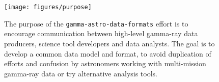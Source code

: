 \begin{figure}[tb]
\centerline{\texttt{[image: figures/purpose]}}
\caption{
The purpose of the \texttt{gamma-astro-data-formats} effort is to encourage communication between high-level gamma-ray data producers, science tool developers and data analysts. The goal is to develop a common data model and format, 
to avoid duplication of efforts and confusion by astronomers working with multi-mission gamma-ray data or try alternative analysis tools.
}
\label{fig:purpose}
\end{figure}



